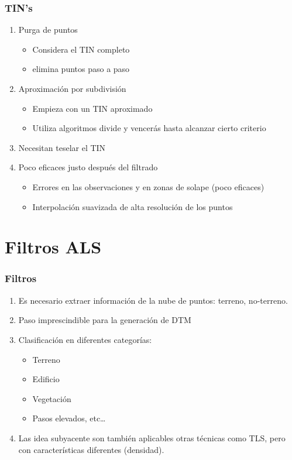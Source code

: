 \begin{frame}
  \frametitle{TIN's}
  \begin{enumerate}
    \item \alert<1-3>{Purga de puntos}
      \begin{itemize}
        \item<2-> Considera el TIN completo 
        \item<3-> elimina puntos paso a paso
      \end{itemize}
    \item \alert<4-5>{Aproximación por subdivisión}
      \begin{itemize}
        \item<4-> Empieza con un TIN aproximado
        \item<5-> Utiliza algoritmos \alert<5>{divide y vencerás} hasta alcanzar cierto
          criterio
      \end{itemize}
    \item<6-> Necesitan teselar el TIN 
    \item<7-> Poco eficaces \alert<7>{justo después} del filtrado
      \begin{itemize}
        \item Errores en las observaciones y en zonas de solape (poco eficaces)
        \item Interpolación suavizada de alta resolución de los puntos
      \end{itemize}
  \end{enumerate}
\end{frame}
\section[Filtros]{Filtros ALS}
\begin{frame}
  \frametitle{Filtros}
  \begin{enumerate}
    \item Es necesario extraer información de la nube de puntos: terreno,
      no-terreno.
    \item Paso imprescindible para la generación de DTM
    \item Clasificación en diferentes categorías:
      \begin{itemize}
        \item Terreno
        \item Edificio
        \item Vegetación
        \item Pasos elevados, etc\ldots
      \end{itemize}
    \item Las idea subyacente son también aplicables otras técnicas como TLS,
      pero con características diferentes (densidad).
  \end{enumerate}
\end{frame}
